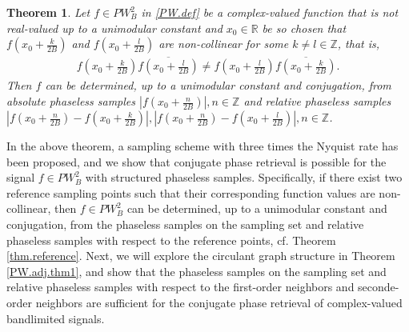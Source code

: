 \documentclass[12pt,oneside,reqno]{amsart}
\newtheorem{theorem}{Theorem}[section]
\newcommand{\Z}{\mathbb{Z}}
\newcommand{\R}{\mathbb{R}}
\numberwithin{equation}{section}
\begin{document}
\begin{theorem}\label{pw.2pts.thm1}
	Let  $f\in PW_B^2$ in \eqref{PW.def} be a complex-valued function that is not real-valued up to a unimodular constant and $x_0\in \R$ be so chosen that $f(x_0+\frac{k}{2B})$ and $f(x_0+\frac{l}{2B})$ are non-collinear for some $k\ne l\in \Z$, that is, 
	\begin{align*}
		f(x_0+\frac{k}{2B})\overline{f(x_0+\frac{l}{2B})}\ne f(x_0+\frac{l}{2B})\overline{f(x_0+\frac{k}{2B})}.
	\end{align*}
Then $f$ can be determined, up to a unimodular constant and conjugation, from absolute phaseless samples $ |f(x_0+\frac{n}{2B})|, n\in \Z $ and relative phaseless samples $  |f(x_0+\frac{n}{2B})-f(x_0+\frac{k}{2B})|, |f(x_0+\frac{n}{2B})-f(x_0+\frac{l}{2B})|, n\in \Z  $.
\end{theorem}

In the above theorem, a sampling scheme with three times the Nyquist rate has been proposed, and we show that conjugate phase retrieval is possible for the signal $f\in PW_B^2$ with structured phaseless samples. %
Specifically, if there exist two reference sampling points such that their corresponding function values are non-collinear, then $f\in PW_B^2$ can be determined, up to a unimodular constant and conjugation,  from the phaseless samples on the sampling set and relative phaseless samples with respect to
the reference points, cf. Theorem \ref{thm.reference}.  Next, we will explore the circulant graph structure in Theorem  \ref{PW.adj.thm1}, and show that the phaseless samples on the sampling set and relative phaseless samples with respect to the first-order neighbors and seconde-order neighbors are sufficient for the conjugate phase retrieval of complex-valued bandlimited signals. 
\end{document}
